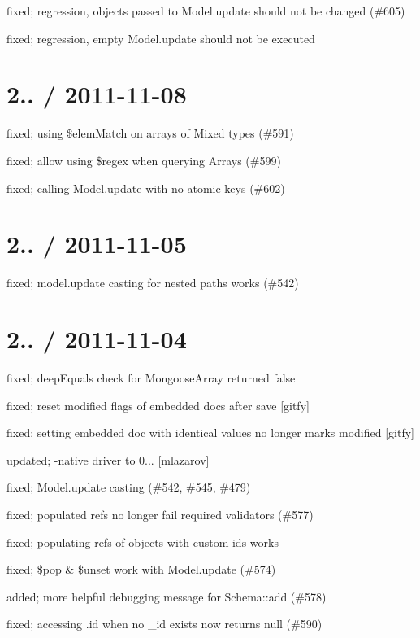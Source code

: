 \begin{DoxyItemize}
\item fixed; regression, objects passed to Model.\+update should not be changed (\#605)
\item fixed; regression, empty Model.\+update should not be executed
\end{DoxyItemize}

\section*{2.. / 2011-\/11-\/08 }


\begin{DoxyItemize}
\item fixed; using \$elem\+Match on arrays of Mixed types (\#591)
\item fixed; allow using \$regex when querying Arrays (\#599)
\item fixed; calling Model.\+update with no atomic keys (\#602)
\end{DoxyItemize}

\section*{2.. / 2011-\/11-\/05 }


\begin{DoxyItemize}
\item fixed; model.\+update casting for nested paths works (\#542)
\end{DoxyItemize}

\section*{2.. / 2011-\/11-\/04 }


\begin{DoxyItemize}
\item fixed; deep\+Equals check for Mongoose\+Array returned false
\item fixed; reset modified flags of embedded docs after save \mbox{[}gitfy\mbox{]}
\item fixed; setting embedded doc with identical values no longer marks modified \mbox{[}gitfy\mbox{]}
\item updated; -\/native driver to 0... \mbox{[}mlazarov\mbox{]}
\item fixed; Model.\+update casting (\#542, \#545, \#479)
\item fixed; populated refs no longer fail required validators (\#577)
\item fixed; populating refs of objects with custom ids works
\item fixed; \$pop \& \$unset work with Model.\+update (\#574)
\item added; more helpful debugging message for Schema\+::add (\#578)
\item fixed; accessing .id when no \+\_\+id exists now returns null (\#590)
\end{DoxyItemize}

